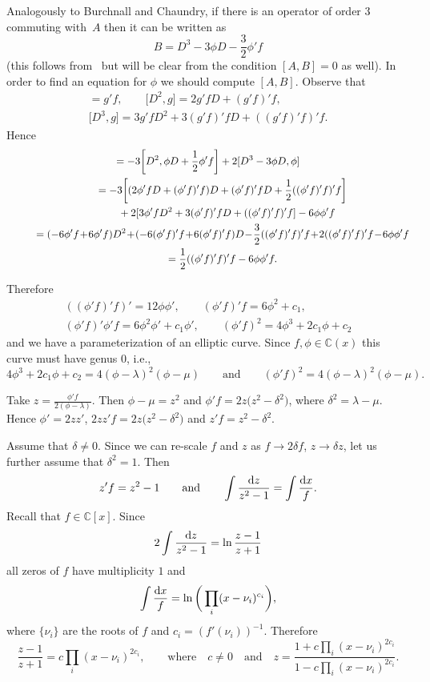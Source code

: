 \documentclass[10pt,a4paper]{amsart}
\numberwithin{equation}{section}
\newcommand{\C}{\mathbb C}
\newcommand{\la}{\lambda}
\begin{document}
Analogously to Burchnall and Chaundry, if there is an operator of order $3$ commuting with~$A$ then it can be written as
\[
B = D^3 - 3\phi D - \frac{3}{2}\phi'f
\]
(this follows from~\cite{BC1} but will be clear from the condition $[A, B] = 0$ as well).
In order to find an equation for $\phi$ we should compute $[A, B]$. Observe that
\begin{gather*}
[D, g(x)] = g'f, \qquad
\big[D^2, g\big] = 2g'fD + (g'f)'f, \\
\big[D^3, g\big] = 3g'fD^2 + 3(g'f)'fD + ((g'f)'f)'f.
\end{gather*}
Hence
\begin{gather*}
[A,B] = -3\bigg[D^2, \phi D + \frac{1}{2}\phi'f\bigg] + 2[D^3 - 3\phi D, \phi]
\\ \hphantom{[A,B]}
{}= -3\bigg[(2\phi'fD + (\phi'f)'f)D + (\phi'f)'fD + \frac{1}{2}((\phi'f)'f)'f\bigg]
\\ \hphantom{[A,B]=}
{}+ 2[3\phi'fD^2 + 3(\phi'f)'fD + ((\phi'f)'f)'f] - 6\phi\phi'f
\\ \hphantom{[A,B]}
{}= (-6\phi'f\! + \!6\phi'f)D^2 \!+\! (-6(\phi'f)'f \!+ \!6(\phi'f)'f)D
\!-\! \frac{3}{2}((\phi'f)'f)'f\!+ \!2((\phi'f)'f)'f\! -\! 6\phi\phi'f
\\ \hphantom{[A,B]}
{}= \frac{1}{2}((\phi'f)'f)'f - 6\phi\phi'f.
\end{gather*}

Therefore
\begin{gather*}
((\phi'f)'f)' = 12\phi\phi', \qquad
(\phi'f)'f = 6\phi^2 + c_1,
\\
(\phi'f)'\phi'f = 6\phi^2\phi' + c_1\phi',\qquad
(\phi'f)^2 = 4\phi^3 + 2c_1\phi + c_2
\end{gather*}
 and we have a parameterization of an elliptic curve. Since $f, \phi \in \C(x)$ this curve must have genus $0$, i.e.,
 \[
 4\phi^3 + 2c_1\phi + c_2 = 4(\phi - \la)^2(\phi - \mu)\qquad \text{and}\qquad (\phi'f)^2 = 4(\phi - \la)^2(\phi - \mu).
 \]

Take $z = \frac{\phi'f}{2(\phi - \la)}$. Then $\phi - \mu = z^2$ and $\phi'f = 2z\big(z^2 - \delta^2\big)$, where $\delta^2 = \la - \mu$. Hence $\phi' = 2zz'$, $2zz'f = 2z\big(z^2 - \delta^2\big)$ and $z'f = z^2 - \delta^2$.

Assume that $\delta \ne 0$. Since we can re-scale $f$ and $z$ as $f \rightarrow 2\delta f$, $z \rightarrow \delta z$, let us further assume that $\delta^2 = 1$.
Then
\[
z'f = z^2 - 1\qquad\text{and}\qquad
\int \frac{{\rm d} z}{z^2 - 1} = \int \frac{{\rm d} x}{f}.
\]
Recall that $f \in \C[x]$. Since
\[
2\int\frac{{\rm d} z}{z^2 - 1} = \ln\frac{z - 1}{z + 1}
\]
all zeros of $f$ have multiplicity $1$ and
\[\int \frac{{\rm d} x}{f} = \ln\bigg(\prod_i(x - \nu_i)^{c_i}\bigg),\] where $\{\nu_i\}$ are the roots of $f$ and $c_i = (f'(\nu_i))^{-1}$. Therefore
\[
\frac{z - 1}{z + 1} = c \prod_i(x - \nu_i)^{2c_i}, \qquad\text{where}\quad
c \ne 0\quad\text{and}\quad
z = \frac{1 + c \prod_i(x - \nu_i)^{2c_i}}{1 - c \prod_i(x - \nu_i)^{2c_i}}.
\]
\end{document}
